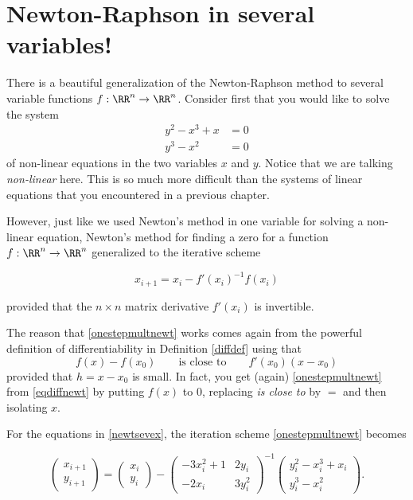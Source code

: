 \documentclass{article}
\begin{document}
\section{Newton-Raphson in several variables!}


There is a beautiful generalization of the Newton-Raphson method to several variable
functions $f:\RR^n\rightarrow \RR^n$. Consider first that you would
like to solve the system
\begin{align}\label{newtsevex}
  y^2-x^3 + x &= 0\\
  y^3-x^2 &= 0
\end{align}
of non-linear equations in the two variables $x$ and $y$. Notice that
we are talking \emph{non-linear} here. This is so much more
difficult than the systems of linear equations that you
encountered in a previous chapter.

However, just like we used Newton's method in one variable for solving
a non-linear equation, Newton's method for finding
a zero for a function $f: \RR^n\rightarrow \RR^n$ generalized to the
iterative scheme
\begin{frameit}
\begin{equation}\label{onestepmultnewt}
  x_{i+1} = x_i - f'(x_i)^{-1} f(x_i)
\end{equation}
\end{frameit}
provided that the $n\times n$ matrix derivative $f'(x_i)$ is invertible.

The reason that \eqref{onestepmultnewt} works comes again from the
powerful definition of differentiability in Definition \ref{diffdef} using that
  \begin{equation}\label{eqdiffnewt}
  f(x) - f(x_0)\qquad \text{is close to}\qquad f'(x_0) (x - x_0)
\end{equation}
provided that $h = x - x_0$ is small. In fact, you get (again)
\eqref{onestepmultnewt} from \eqref{eqdiffnewt} by putting $f(x)$ to
$0$, replacing \emph{is close to} by $=$ and then isolating $x$.

For the equations in \eqref{newtsevex}, the iteration scheme \eqref{onestepmultnewt} becomes

\begin{equation}\label{exnewtmult}
    \begin{pmatrix}
      x_{i+1} \\ y_{i+1}
    \end{pmatrix} =
    \begin{pmatrix}
      x_i\\ y_i
    \end{pmatrix} -
    \begin{pmatrix}
      - 3 x_i^2+1 & 2 y_i\\
      -2 x_i & 3 y_i^2
    \end{pmatrix}^{-1}
    \begin{pmatrix}
      y_i^2-x_i^3 + x_i\\ y_i^3 - x_i^2
    \end{pmatrix}.
  \end{equation}
\end{document}
